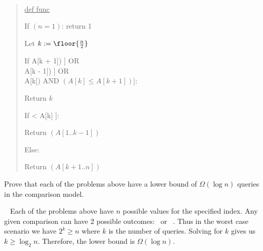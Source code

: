 \documentclass[10pt]{article}
\begin{document}
\begin{solution}\ %
\begin{quote}%
\noindent\ul{def func }%

%

\begin{steps}
\item If \( (n = 1) \): return 1 
\item Let \( k := \floor{\frac{n}{2}} \)
\item If \big[\( (k = 1) \) AND \( (A[k] \leq A[k + 1]) \)\big] OR \\
  \nf{\quad}\big[\( (k = n) \) AND \( \big(A[k] \leq A[k - 1]\big) \)\big] OR \\
  \nf{\quad}\big[\( (1 < k < n) \) AND \( (A[k - 1] \geq A[k]) \) AND \( (A[k] \leq A[k + 1]) \)\big]: 
  \begin{steps}
  \item Return \( k \)
  \end{steps}
\item If \big[\( (k > 1) \)  AND \( A[k-1] < A[k] \)\big]:
  \begin{steps}
  \item Return \( (A[1..k-1]) \)
  \end{steps}
\item Else:
  \begin{steps}
  \item Return \( (A[k+1..n]) \)
  \end{steps}
\end{steps}
\end{quote}
\end{solution}
\pagebreak

Prove that each of the problems above have a lower bound of \( \Omega(\log n) \) queries in the comparison model.

\begin{solution}\ %
Each of the problems above have \( n \) possible values for the specified index. Any given comparison can have 2 possible outcomes: \boolT~or \boolF~. Thus in the worst case scenario we have \( 2^k \geq n \) where \( k \) is the number of queries. Solving for \( k \) gives us \( k \geq \log_2 n \). Therefore, the lower bound is \( \Omega(\log n) \).
\end{solution}
\pagebreak
\end{document}
